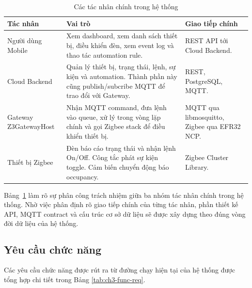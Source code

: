 \begin{table}[H]
    \centering
    \caption{Các tác nhân chính trong hệ thống}
    \label{tab:ch3-actors}
    \footnotesize
    \setlength{\tabcolsep}{3pt}
    \begin{tabular}{|>{\raggedright\arraybackslash}p{3.2cm}|>{\raggedright\arraybackslash}p{6.1cm}|>{\raggedright\arraybackslash}p{4.6cm}|}
        \hline
        \textbf{Tác nhân} & \textbf{Vai trò} & \textbf{Giao tiếp chính} \\
        \hline
        Người dùng Mobile & Xem dashboard, xem danh sách thiết bị, điều khiển đèn, xem event log và thao tác automation rule. & REST API tới Cloud Backend. \\
        \hline
        Cloud Backend & Quản lý thiết bị, trạng thái, lệnh, sự kiện và automation. Thành phần này cũng publish/subcribe MQTT để trao đổi với Gateway. & REST, PostgreSQL, MQTT. \\
        \hline
        Gateway Z3GatewayHost & Nhận MQTT command, đưa lệnh vào queue, xử lý trong vòng lặp chính và gọi Zigbee stack để điều khiển thiết bị. & MQTT qua libmosquitto, Zigbee qua EFR32 NCP. \\
        \hline
        Thiết bị Zigbee & Đèn báo cáo trạng thái và nhận lệnh On/Off. Công tắc phát sự kiện toggle. Cảm biến chuyển động báo occupancy. & Zigbee Cluster Library. \\
        \hline
    \end{tabular}
    \setlength{\tabcolsep}{6pt}
\end{table}

Bảng~\ref{tab:ch3-actors} làm rõ sự phân công trách nhiệm giữa ba nhóm tác nhân chính trong hệ thống. Nhờ việc phân định rõ giao tiếp chính của từng tác nhân, phần thiết kế API, MQTT contract và cấu trúc cơ sở dữ liệu sẽ được xây dựng theo đúng vòng đời dữ liệu của hệ thống.

\newpage
\subsection{Yêu cầu chức năng}
\label{sec:ch3-yeucau-chucnang}

Các yêu cầu chức năng được rút ra từ đường chạy hiện tại của hệ thống được tổng hợp chi tiết trong Bảng \ref{tab:ch3-func-req}.

